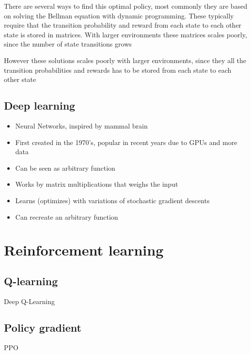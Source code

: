 \documentclass[12pt,A4]{report}
\theoremstyle{definition}
\begin{document}
There are several ways to find this optimal policy, most commonly they are based on solving the Bellman equation with dynamic programming. These typically require that the transition probability and reward from each state to each other state is stored in matrices. With larger environments these matrices scales poorly, since the number of state transitions grows 

However these solutions scales poorly with larger environments, since they all the transition probabilities and rewards has to be stored from each state to each other state 


\subsection{Deep learning}
\begin{itemize}
  \item Neural Networks, inspired by mammal brain
  \item First created in the 1970's, popular in recent years due to GPUs and more data
  \item Can be seen as arbitrary function
  \item Works by matrix multiplications that weighs the input 
  \item Learns (optimizes) with variations of stochastic gradient descents
  \item Can recreate an arbitrary function
\end{itemize}

\section{Reinforcement learning}

\subsection{Q-learning}
Deep Q-Learning

\subsection{Policy gradient}
PPO
\end{document}
